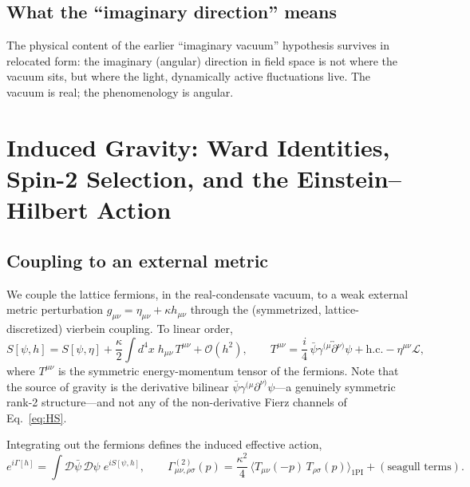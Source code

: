 \documentclass[11pt,a4paper]{article}
\begin{document}
\subsection{What the ``imaginary direction'' means}

The physical content of the earlier ``imaginary vacuum''
hypothesis survives in relocated form: the imaginary (angular)
direction in field space is not where the vacuum sits, but where
the light, dynamically active fluctuations live.
The vacuum is real; the phenomenology is angular.


\section{Induced Gravity: Ward Identities, Spin-2 Selection, and
the Einstein--Hilbert Action}
\label{sec:induced}

\subsection{Coupling to an external metric}

We couple the lattice fermions, in the real-condensate vacuum, to a
weak external metric perturbation
$g_{\mu\nu} = \eta_{\mu\nu} + \kappa h_{\mu\nu}$ through the
(symmetrized, lattice-discretized) vierbein coupling.
To linear order,
\begin{equation}
S[\psi, h] = S[\psi, \eta]
+ \frac{\kappa}{2}\int d^4x\; h_{\mu\nu}\,T^{\mu\nu}
+ \mathcal{O}(h^2),
\qquad
T^{\mu\nu} = \frac{i}{4}\,\bar{\psi}\gamma^{(\mu}
\!\overleftrightarrow{\partial}{}^{\nu)}\psi + \mathrm{h.c.}
- \eta^{\mu\nu}\mathcal{L},
\label{eq:Tcoupling}
\end{equation}
where $T^{\mu\nu}$ is the symmetric energy-momentum tensor of the
fermions.
Note that the source of gravity is the derivative bilinear
$\bar{\psi}\gamma^{(\mu}\partial^{\nu)}\psi$---a genuinely
symmetric rank-2 structure---and not any of the non-derivative
Fierz channels of Eq.~\eqref{eq:HS}.

Integrating out the fermions defines the induced effective action,
\begin{equation}
e^{i\Gamma[h]} = \int \mathcal{D}\bar\psi\,\mathcal{D}\psi\;
e^{iS[\psi,h]},
\qquad
\Gamma^{(2)}_{\mu\nu,\rho\sigma}(p)
= \frac{\kappa^2}{4}\,
\bigl\langle T_{\mu\nu}(-p)\,T_{\rho\sigma}(p)
\bigr\rangle_{\mathrm{1PI}}
+ (\text{seagull terms}).
\label{eq:Gamma2}
\end{equation}
\end{document}

